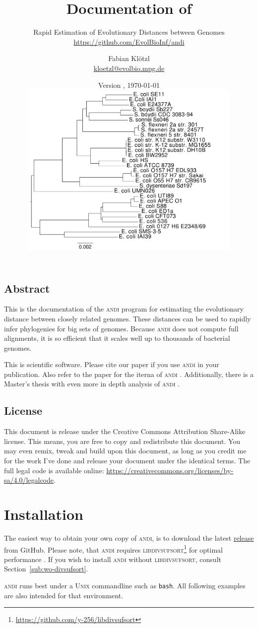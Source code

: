 \documentclass[a4paper,
  10pt,
  english,
  DIV=12,
  BCOR=8mm]{scrbook}
\title{Documentation of \algo{andi}}
\subtitle{Rapid Estimation of Evolutionary Distances between Genomes\\ {\small\url{https://github.com/EvolBioInf/andi}}}
\author{Fabian Klötzl\\ \href{mailto:kloetzl@evolbio.mpg.de}{kloetzl@evolbio.mpg.de}}
\date{Version \version, \isodate\today \\
\vspace*{2cm}
\centering\includegraphics[width=0.8\textwidth]{andi_labels.pdf}}
\newcommand{\algo}[1]{\textsc{{#1}}}
\newcommand{\andi}{\algo{andi} }
\begin{document}
\maketitle

\section*{Abstract}
This is the documentation of the \andi program for estimating the evolutionary distance between closely related genomes. These distances can be used to rapidly infer phylogenies for big sets of genomes. Because \andi does not compute full alignments, it is so efficient that it scales well up to thousands of bacterial genomes.

This is scientific software. Please cite our paper \cite{andi} if you use \andi in your publication. Also refer to the paper for the iterna of \andi. Additionally, there is a Master's thesis with even more in depth analysis of \andi \cite{kloetzl}.

\vspace*{1cm}
\section*{License}
This document is release under the Creative Commons Attribution Share-Alike license. This means, you are free to copy and redistribute this document. You may even remix, tweak and build upon this document, as long as you credit me for the work I've done and release your document under the identical terms. The full legal code is available online: {\small\url{https://creativecommons.org/licenses/by-sa/4.0/legalcode}}.

\tableofcontents

\chapter{Installation} %

The easiest way to obtain your own copy of \algo{andi}, is to download the latest \href{https://github.com/EvolBioInf/andi/releases}{release} from GitHub. Please note, that \andi requires \algo{libdivsufsort}\footnote{\url{https://github.com/y-256/libdivsufsort}} for optimal performance \cite{divsufsort}. If you wish to install \andi without \algo{libdivsufsort}, consult Section~\ref{sub:wo-divsufsort}.

\andi runs best under a \algo{Unix} commandline such as \lstinline$bash$. All following examples are also intended for that environment.
\end{document}
